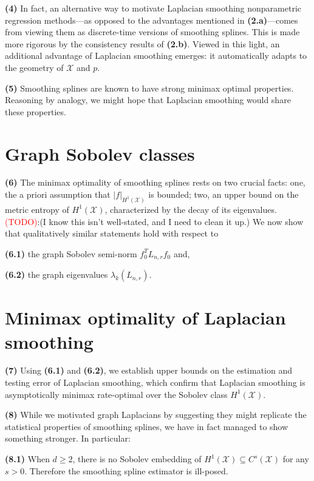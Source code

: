 \documentclass{article}
\newcommand{\1}{\mathbf{1}}
\newcommand{\Lap}{L}
\newcommand{\Xset}{\mathcal{X}}
\theoremstyle{alden}
\theoremstyle{aldenthm}
\theoremstyle{definition}
\theoremstyle{remark}
\begin{document}
\textbf{(4)} In fact, an alternative way to motivate Laplacian smoothing nonparametric regression methods---as opposed to the advantages mentioned in \textbf{(2.a)}---comes from viewing them as discrete-time versions of smoothing splines. This is made more rigorous by the consistency results of \textbf{(2.b)}. Viewed in this light, an additional advantage of Laplacian smoothing emerges: it automatically adapts to the geometry of $\Xset$ and $p$. 

\textbf{(5)} Smoothing splines are known to have strong minimax optimal properties. Reasoning by analogy, we might hope that Laplacian smoothing would share these properties. 

\section{Graph Sobolev classes}

\textbf{(6)} The minimax optimality of smoothing splines rests on two crucial facts: one, the a priori assumption that $|f|_{H^1(\Xset)}$ is bounded; two, an upper bound on the metric entropy of $H^1(\Xset)$, characterized by the decay of its eigenvalues. \textcolor{red}{(TODO)}:(I know this isn't well-stated, and I need to clean it up.)  We now show that qualitatively similar statements hold with respect to 

\quad \textbf{(6.1)} the graph Sobolev semi-norm $f_0^T \Lap_{n,r} f_0$ and,
 
\quad \textbf{(6.2)} the graph eigenvalues $\lambda_k(\Lap_{n,r})$. 

\section{Minimax optimality of Laplacian smoothing}

\textbf{(7)} Using \textbf{(6.1)} and \textbf{(6.2)}, we establish upper bounds on the estimation and testing error of Laplacian smoothing, which confirm that Laplacian smoothing is asymptotically minimax rate-optimal over the Sobolev class $H^1(\Xset)$. 

\textbf{(8)} While we motivated graph Laplacians by suggesting they might replicate the statistical properties of smoothing splines, we have in fact managed to show something stronger. In particular:

\quad \textbf{(8.1)} When $d \geq 2$, there is no Sobolev embedding of $H^1(\Xset) \subseteq C^s(\Xset)$ for any $s > 0$. Therefore the smoothing spline estimator is ill-posed.
\end{document}
